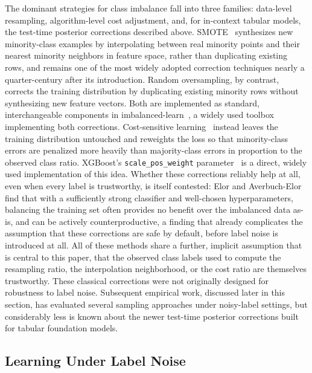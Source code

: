 The dominant strategies for class imbalance fall into three families:
data-level resampling, algorithm-level cost adjustment, and, for
in-context tabular models, the test-time posterior corrections described
above. SMOTE~\cite{chawla2002smote} synthesizes new minority-class examples by
interpolating between real minority points and their nearest minority
neighbors in feature space, rather than duplicating existing rows, and remains
one of the most widely adopted correction techniques nearly a quarter-century
after its introduction. Random oversampling, by contrast, corrects the
training distribution by duplicating existing minority rows without
synthesizing new feature vectors. Both are implemented as standard,
interchangeable components in imbalanced-learn~\cite{lemaitre2017imbalancedlearn},
a widely used toolbox implementing both corrections. Cost-sensitive
learning~\cite{elkan2001costsensitive} instead leaves the training
distribution untouched and reweights the loss so that minority-class errors
are penalized more heavily than majority-class errors in proportion to the
observed class ratio. XGBoost's \texttt{scale\_pos\_weight}
parameter~\cite{chen2016xgboost} is a direct, widely used implementation of
this idea. Whether these
corrections reliably help at all, even when every label is trustworthy, is
itself contested: Elor and Averbuch-Elor~\cite{elor2022smote} find that with
a sufficiently strong classifier and well-chosen hyperparameters, balancing
the training set often provides no benefit over the imbalanced data as-is,
and can be actively counterproductive, a finding that already complicates
the assumption that these corrections are safe by default, before label
noise is introduced at all. All of these methods share a further, implicit
assumption that is central to this paper, that the
observed class labels used to compute the resampling ratio, the interpolation
neighborhood, or the cost ratio are themselves trustworthy. These classical corrections were not originally designed for robustness
to label noise. Subsequent empirical work, discussed later in this
section, has evaluated several sampling approaches under noisy-label
settings, but considerably less is known about the newer test-time
posterior corrections built for tabular foundation models.

\subsection{Learning Under Label Noise}

